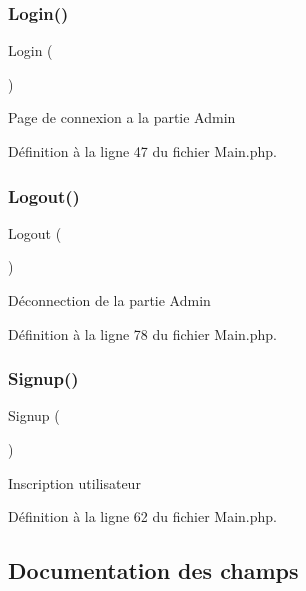 \subsubsection{\texorpdfstring{Login()}{Login()}}
{\footnotesize\ttfamily Login (\begin{DoxyParamCaption}{ }\end{DoxyParamCaption})}

Page de connexion a la partie Admin 

Définition à la ligne 47 du fichier Main.\+php.

\mbox{\label{class_src_1_1_controllers_1_1_main_aa14f760d541a59acb41ac8eefddafb9b}} 
\subsubsection{\texorpdfstring{Logout()}{Logout()}}
{\footnotesize\ttfamily Logout (\begin{DoxyParamCaption}{ }\end{DoxyParamCaption})}

Déconnection de la partie Admin 

Définition à la ligne 78 du fichier Main.\+php.

\mbox{\label{class_src_1_1_controllers_1_1_main_aba348654bb87049dfb96fa24794b191b}} 
\subsubsection{\texorpdfstring{Signup()}{Signup()}}
{\footnotesize\ttfamily Signup (\begin{DoxyParamCaption}{ }\end{DoxyParamCaption})}

Inscription utilisateur 

Définition à la ligne 62 du fichier Main.\+php.



\subsection{Documentation des champs}
\mbox{\label{class_src_1_1_controllers_1_1_main_a7205c4d22c61e375f2be552a32f97ccb}} 

